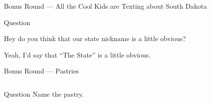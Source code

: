 \documentclass[11pt]{beamer}
\begin{document}
\begin{frame}[t]{Bonus Round --- All the Cool Kids are Texting about South Dakota}
\begin{block}{Question}

\begin{minipage}{0.9\textwidth}
\begin{mdframed}[
    roundcorner=7pt,
    backgroundcolor=black!5,
    linecolor=black!5,
    fontcolor=black,
    ignorelastdescenders]
\begin{flushleft}
{\small{}\selectfont{}
Hey do you think that our state nickname is a little obvious?
}
\end{flushleft}
\end{mdframed}
\end{minipage}

\hfill{}\begin{minipage}{0.9\textwidth}
\begin{mdframed}[
    roundcorner=7pt,
    backgroundcolor=blue!80!white,
    linecolor=blue!80!white,
    fontcolor=white,
    ignorelastdescenders]
\begin{flushleft}
{\small{}\selectfont{}
Yeah, I'd say that ``The \textunderscore{}\textunderscore{}\textunderscore{}\textunderscore{}\textunderscore{}\textunderscore{} \textunderscore{}\textunderscore{}\textunderscore{}\textunderscore{}\textunderscore{}\textunderscore{} State'' is a little obvious.
}
\end{flushleft}
\end{mdframed}
\end{minipage}
\end{block}
\end{frame}
\begin{frame}[t]{Bonus Round --- Pastries}
\begin{columns}[T,totalwidth=\linewidth]
\begin{column}{0.32\linewidth}
\begin{block}{Question}
Name the pastry.
\end{block}
\end{column}
\begin{column}{0.65\linewidth}
\begin{center}
\texttt{[image: \{Images/cronut]}.jpg}
\end{center}
\end{column}
\end{columns}
\end{frame}
\end{document}
